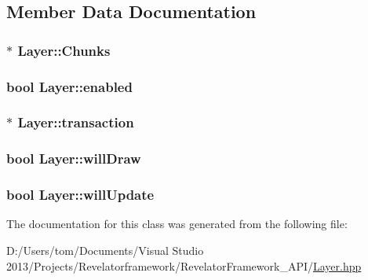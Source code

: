 \subsection{Member Data Documentation}
\hypertarget{class_layer_ab5408f6d27ad51d73df507296f16c811}{
\subsubsection[{Chunks}]{$\ast$ Layer\-::\-Chunks\hspace{0.3cm}{\ttfamily [protected]}}}\label{class_layer_ab5408f6d27ad51d73df507296f16c811}
\hypertarget{class_layer_af9f9c9a8c4a053bd829a06273df297bd}{
\subsubsection[{enabled}]{\setlength{\rightskip}{0pt plus 5cm}bool Layer\-::enabled\hspace{0.3cm}{\ttfamily [protected]}}}\label{class_layer_af9f9c9a8c4a053bd829a06273df297bd}
\hypertarget{class_layer_a3f0f6e109409d047c650380b6715c316}{
\subsubsection[{transaction}]{$\ast$ Layer\-::transaction\hspace{0.3cm}{\ttfamily [protected]}}}\label{class_layer_a3f0f6e109409d047c650380b6715c316}
\hypertarget{class_layer_a64902a81921ba2fc792d044392b14ecc}{
\subsubsection[{will\-Draw}]{\setlength{\rightskip}{0pt plus 5cm}bool Layer\-::will\-Draw\hspace{0.3cm}{\ttfamily [protected]}}}\label{class_layer_a64902a81921ba2fc792d044392b14ecc}
\hypertarget{class_layer_a8c3badeb437135a265c931f4ee728a48}{
\subsubsection[{will\-Update}]{\setlength{\rightskip}{0pt plus 5cm}bool Layer\-::will\-Update\hspace{0.3cm}{\ttfamily [protected]}}}\label{class_layer_a8c3badeb437135a265c931f4ee728a48}


The documentation for this class was generated from the following file\-:\begin{DoxyCompactItemize}
\item 
D\-:/\-Users/tom/\-Documents/\-Visual Studio 2013/\-Projects/\-Revelatorframework/\-Revelator\-Framework\-\_\-\-A\-P\-I/\hyperlink{_layer_8hpp}{Layer.\-hpp}\end{DoxyCompactItemize}
